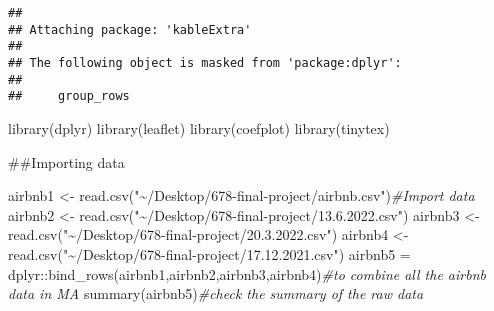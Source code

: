 \documentclass[
]{article}
\newenvironment{Shaded}{\begin{snugshade}}{\end{snugshade}}
\newcommand{\CommentTok}[1]{\textcolor[rgb]{0.56,0.35,0.01}{\textit{#1}}}
\newcommand{\FunctionTok}[1]{\textcolor[rgb]{0.00,0.00,0.00}{#1}}
\newcommand{\NormalTok}[1]{#1}
\newcommand{\OtherTok}[1]{\textcolor[rgb]{0.56,0.35,0.01}{#1}}
\newcommand{\SpecialCharTok}[1]{\textcolor[rgb]{0.00,0.00,0.00}{#1}}
\newcommand{\StringTok}[1]{\textcolor[rgb]{0.31,0.60,0.02}{#1}}
\begin{document}
\begin{verbatim}
## 
## Attaching package: 'kableExtra'
## 
## The following object is masked from 'package:dplyr':
## 
##     group_rows
\end{verbatim}

\begin{Shaded}
\begin{Highlighting}[]
\FunctionTok{library}\NormalTok{(dplyr)}
\FunctionTok{library}\NormalTok{(leaflet)}
\FunctionTok{library}\NormalTok{(coefplot)}
\FunctionTok{library}\NormalTok{(tinytex)}
\end{Highlighting}
\end{Shaded}

\#\#Importing data

\begin{Shaded}
\begin{Highlighting}[]
\NormalTok{airbnb1 }\OtherTok{\textless{}{-}} \FunctionTok{read.csv}\NormalTok{(}\StringTok{"\textasciitilde{}/Desktop/678{-}final{-}project/airbnb.csv"}\NormalTok{)}\CommentTok{\#Import data}
\NormalTok{airbnb2 }\OtherTok{\textless{}{-}} \FunctionTok{read.csv}\NormalTok{(}\StringTok{"\textasciitilde{}/Desktop/678{-}final{-}project/13.6.2022.csv"}\NormalTok{)}
\NormalTok{airbnb3 }\OtherTok{\textless{}{-}} \FunctionTok{read.csv}\NormalTok{(}\StringTok{"\textasciitilde{}/Desktop/678{-}final{-}project/20.3.2022.csv"}\NormalTok{)}
\NormalTok{airbnb4 }\OtherTok{\textless{}{-}} \FunctionTok{read.csv}\NormalTok{(}\StringTok{"\textasciitilde{}/Desktop/678{-}final{-}project/17.12.2021.csv"}\NormalTok{)}
\NormalTok{airbnb5 }\OtherTok{=}\NormalTok{ dplyr}\SpecialCharTok{::}\FunctionTok{bind\_rows}\NormalTok{(airbnb1,airbnb2,airbnb3,airbnb4)}\CommentTok{\#to combine all the airbnb data in MA}
\FunctionTok{summary}\NormalTok{(airbnb5)}\CommentTok{\#check the summary of the raw data}
\end{Highlighting}
\end{Shaded}
\end{document}
